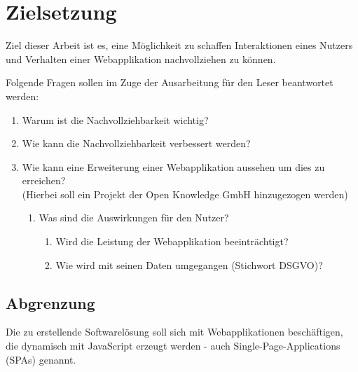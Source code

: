 \section{Zielsetzung}

Ziel dieser Arbeit ist es, eine Möglichkeit zu schaffen Interaktionen eines Nutzers und Verhalten einer Webapplikation nachvollziehen zu können. 

Folgende Fragen sollen im Zuge der Ausarbeitung für den Leser beantwortet werden:

\begin{enumerate}
	\item Warum ist die Nachvollziehbarkeit wichtig?
	\item Wie kann die Nachvollziehbarkeit verbessert werden?
	\item Wie kann eine Erweiterung einer Webapplikation aussehen um dies zu erreichen? \\ (Hierbei soll ein Projekt der Open Knowledge GmbH hinzugezogen werden)
	\begin{enumerate}
		\item Was sind die Auswirkungen für den Nutzer?
		\begin{enumerate}
			\item Wird die Leistung der Webapplikation beeinträchtigt?
			\item Wie wird mit seinen Daten umgegangen (Stichwort DSGVO)?
		\end{enumerate}
	\end{enumerate}
\end{enumerate}


\subsection{Abgrenzung}

Die zu erstellende Softwarelösung soll sich mit Webapplikationen beschäftigen, die dynamisch mit JavaScript erzeugt werden - auch Single-Page-Applications (SPAs) genannt. 

